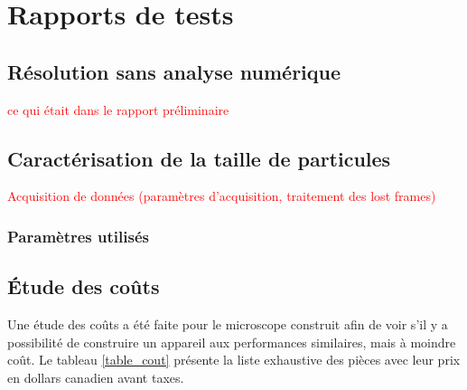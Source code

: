 \documentclass[11pt,letterpaper]{article}
\begin{document}
\section{Rapports de tests}

\subsection{Résolution sans analyse numérique}

\textcolor{red}{ce qui était dans le rapport préliminaire}


\subsection{Caractérisation de la taille de particules}

\textcolor{red}{Acquisition de données (paramètres d'acquisition, traitement des lost frames)}

\textcolor{red}{}

\subsubsection{Paramètres utilisés}



\subsection{Étude des coûts}

Une étude des coûts a été faite pour le microscope construit afin de voir s'il y a possibilité
de construire un appareil aux performances similaires, mais à moindre coût. Le tableau \ref{table_cout}
présente la liste exhaustive des pièces avec leur prix en dollars canadien avant taxes.
\end{document}
